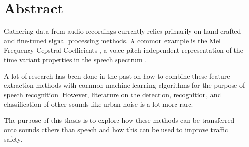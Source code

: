 \chapter*{Abstract}

\begin{center}
\begin{minipage}[t]{.8\textwidth}
\setlength{\parskip}{.5\baselineskip}


Gathering data from audio recordings currently relies primarily on hand-crafted and fine-tuned signal processing methods.
A common example is the Mel Frequency Cepstral Coefficients \cite{1168654}, a voice pitch independent representation of the time variant properties in the speech spectrum \cite{Hanson1996}.

A lot of research has been done in the past on how to combine these feature extraction methods with common machine learning algorithms for the purpose of speech recognition.
However, literature on the detection, recognition, and classification of other sounds like urban noise is a lot more rare.

The purpose of this thesis is to explore how these methods can be transferred onto sounds others than speech and how this can be used to improve traffic safety.


\end{minipage}
\end{center}
